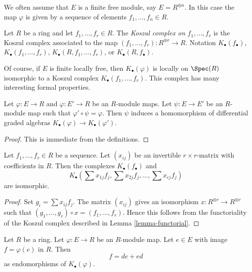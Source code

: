 \medskip\noindent
We often assume that $E$ is a finite free module, say $E = R^{\oplus n}$.
In this case the map $\varphi$ is given by a sequence of elements
$f_1, \ldots, f_n \in R$.

\begin{definition}
\label{definition-koszul-complex}
Let $R$ be a ring and let $f_1, \ldots, f_r \in R$. The
{\it Koszul complex on $f_1, \ldots, f_r$} is the Koszul complex
associated to the map $(f_1, \ldots, f_r) : R^{\oplus r} \to R$.
Notation $K_\bullet(f_\bullet)$, $K_\bullet(f_1, \ldots, f_r)$,
$K_\bullet(R, f_1, \ldots, f_r)$, or $K_\bullet(R, f_\bullet)$.
\end{definition}

\noindent
Of course, if $E$ is finite locally free, then $K_\bullet(\varphi)$ is
locally on $\Spec(R)$ isomorphic to a Koszul complex
$K_\bullet(f_1, \ldots, f_r)$.
This complex has many interesting formal properties.

\begin{lemma}
\label{lemma-functorial}
Let $\varphi : E \to R$ and $\varphi : E' \to R$ be an $R$-module maps.
Let $\psi : E \to E'$ be an $R$-module map such that
$\varphi' \circ \psi = \varphi$. Then $\psi$ induces a
homomorphism of differential graded algebras
$K_\bullet(\varphi) \to K_\bullet(\varphi')$.
\end{lemma}

\begin{proof}
This is immediate from the definitions.
\end{proof}

\begin{lemma}
\label{lemma-change-basis}
Let $f_1, \ldots, f_r \in R$ be a sequence.
Let $(x_{ij})$ be an invertible $r \times r$-matrix with
coefficients in $R$. Then the complexes
$K_\bullet(f_\bullet)$ and
$$
K_\bullet(\sum x_{1j}f_j, \sum x_{2j}f_j, \ldots, \sum x_{cj}f_j)
$$
are isomorphic.
\end{lemma}

\begin{proof}
Set $g_i = \sum x_{ij}f_j$.
The matrix $(x_{ij})$ gives an isomorphism $x : R^{\oplus r} \to R^{\oplus r}$
such that $(g_1, \ldots, g_r) \circ x = (f_1, \ldots, f_r)$.
Hence this follows from the functoriality of the Koszul complex
described in
Lemma \ref{lemma-functorial}.
\end{proof}

\begin{lemma}
\label{lemma-homotopy-koszul-abstract}
Let $R$ be a ring. Let $\varphi : E \to R$ be an $R$-module map.
Let $e \in E$ with image $f = \varphi(e)$ in $R$. Then
$$
f = de + ed
$$
as endomorphisms of $K_\bullet(\varphi)$.
\end{lemma}

